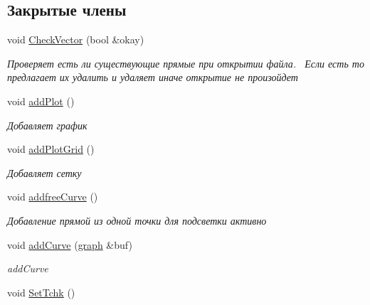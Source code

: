 \subsection*{Закрытые члены}
\begin{DoxyCompactItemize}
\item 
void \hyperlink{class_main_window_a236bdec985319b80062b14e4e53bf2a0}{Check\+Vector} (bool \&okay)\hypertarget{class_main_window_a236bdec985319b80062b14e4e53bf2a0}{}\label{class_main_window_a236bdec985319b80062b14e4e53bf2a0}

\begin{DoxyCompactList}\small\item\em Проверяет есть ли существующие прямые при открытии файла.~\newline
 Если есть то предлагает их удалить и удаляет иначе открытие не произойдет \end{DoxyCompactList}\item 
void \hyperlink{class_main_window_a77cab55db6f0a5b74c9f7d3da47e006f}{add\+Plot} ()\hypertarget{class_main_window_a77cab55db6f0a5b74c9f7d3da47e006f}{}\label{class_main_window_a77cab55db6f0a5b74c9f7d3da47e006f}

\begin{DoxyCompactList}\small\item\em Добавляет график \end{DoxyCompactList}\item 
void \hyperlink{class_main_window_abb03c14d2a968e50a8d069b73f27efb0}{add\+Plot\+Grid} ()\hypertarget{class_main_window_abb03c14d2a968e50a8d069b73f27efb0}{}\label{class_main_window_abb03c14d2a968e50a8d069b73f27efb0}

\begin{DoxyCompactList}\small\item\em Добавляет сетку \end{DoxyCompactList}\item 
void \hyperlink{class_main_window_a3d6f33a054126933c27adefd9ea329e0}{addfree\+Curve} ()\hypertarget{class_main_window_a3d6f33a054126933c27adefd9ea329e0}{}\label{class_main_window_a3d6f33a054126933c27adefd9ea329e0}

\begin{DoxyCompactList}\small\item\em Добавление прямой из одной точки для подсветки активно \end{DoxyCompactList}\item 
void \hyperlink{class_main_window_aa5c0998b1192bfab3ff83b02c42b2c67}{add\+Curve} (\hyperlink{classgraph}{graph} \&buf)
\begin{DoxyCompactList}\small\item\em add\+Curve \end{DoxyCompactList}\item 
void \hyperlink{class_main_window_a167ea3c098e223361ff8d2300d71d6ae}{Set\+Tchk} ()\hypertarget{class_main_window_a167ea3c098e223361ff8d2300d71d6ae}{}\label{class_main_window_a167ea3c098e223361ff8d2300d71d6ae}


\end{DoxyCompactItemize}
